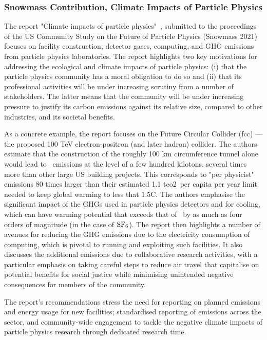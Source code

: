 \documentclass[../SustainableHEP.tex]{subfiles}
\begin{document}
\subsubsection{Snowmass Contribution, Climate Impacts of Particle Physics}

The report "Climate impacts of particle physics"~\cite{Bloom:2022gux}, submitted to the proceedings of the US Community Study on the Future of Particle Physics (Snowmass 2021) focuses on facility construction, detector gases, computing, and GHG emissions from particle physics laboratories. 
The report highlights two key motivations for addressing the ecological and climate impacts of particle physics: (i) that the particle physics community has a moral obligation to do so and (ii) that its professional activities will be under increasing scrutiny from a number of stakeholders. 
The latter means that the community will be under increasing pressure to justify its carbon emissions against its relative size, compared to other industries, and its societal benefits.

As a concrete example, the report focuses on the Future Circular Collider (\acrshort{fcc}) --- the proposed 100 TeV electron-positron (and later hadron) collider. 
The authors estimate that the construction of the roughly 100 km circumference tunnel alone would lead to \CdO\ emissions at the level of a few hundred kilotons, several times more than other large US building projects.
This corresponds to "per physicist" emissions 80 times larger than their estimated 1.1 \acrshort{tco2}\ per capita per year limit needed to keep global warming to less that 1.5\degree C. The authors emphasise the significant impact of the GHGs used in particle physics detectors and for cooling, which can have warming potential that exceeds that of \CdO\ by as much as four orders of magnitude (in the case of ${\rm SF}_6$).  
The report then highlights a number of avenues for reducing the GHG emissions due to the electricity consumption of computing, which is pivotal to running and exploiting such facilities. It also discusses the additional emissions due to collaborative research activities, with a particular emphasis on taking careful steps to reduce air travel that capitalise on potential benefits for social justice while minimising unintended negative consequences for members of the community.

The report's recommendations stress the need for reporting on planned emissions and energy usage for new facilities; standardised reporting of emissions across the sector, and community-wide engagement to tackle the negative climate impacts of particle physics research through dedicated research time.
\end{document}
